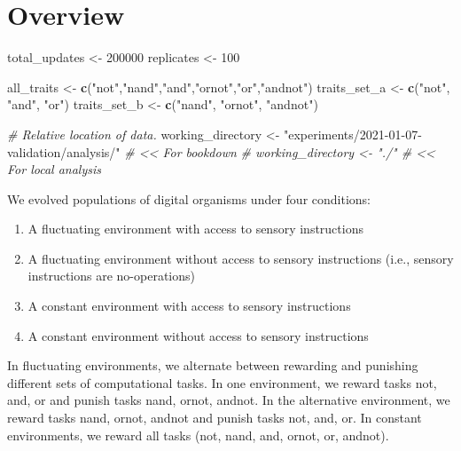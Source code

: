\documentclass[]{book}
\newenvironment{Shaded}{\begin{snugshade}}{\end{snugshade}}
\newcommand{\CommentTok}[1]{\textcolor[rgb]{0.56,0.35,0.01}{\textit{#1}}}
\newcommand{\DecValTok}[1]{\textcolor[rgb]{0.00,0.00,0.81}{#1}}
\newcommand{\KeywordTok}[1]{\textcolor[rgb]{0.13,0.29,0.53}{\textbf{#1}}}
\newcommand{\NormalTok}[1]{#1}
\newcommand{\StringTok}[1]{\textcolor[rgb]{0.31,0.60,0.02}{#1}}
\providecommand{\tightlist}{%
  \setlength{\itemsep}{0pt}\setlength{\parskip}{0pt}}
\begin{document}
\hypertarget{overview}{%
\section{Overview}\label{overview}}

\begin{Shaded}
\begin{Highlighting}[]
\NormalTok{total_updates <-}\StringTok{ }\DecValTok{200000}
\NormalTok{replicates <-}\StringTok{ }\DecValTok{100}

\NormalTok{all_traits <-}\StringTok{ }\KeywordTok{c}\NormalTok{(}\StringTok{"not"}\NormalTok{,}\StringTok{"nand"}\NormalTok{,}\StringTok{"and"}\NormalTok{,}\StringTok{"ornot"}\NormalTok{,}\StringTok{"or"}\NormalTok{,}\StringTok{"andnot"}\NormalTok{)}
\NormalTok{traits_set_a <-}\StringTok{ }\KeywordTok{c}\NormalTok{(}\StringTok{"not"}\NormalTok{, }\StringTok{"and"}\NormalTok{, }\StringTok{"or"}\NormalTok{)}
\NormalTok{traits_set_b <-}\StringTok{ }\KeywordTok{c}\NormalTok{(}\StringTok{"nand"}\NormalTok{, }\StringTok{"ornot"}\NormalTok{, }\StringTok{"andnot"}\NormalTok{)}

\CommentTok{# Relative location of data.}
\NormalTok{working_directory <-}\StringTok{ "experiments/2021-01-07-validation/analysis/"} \CommentTok{# << For bookdown}
\CommentTok{# working_directory <- "./"                                              # << For local analysis}
\end{Highlighting}
\end{Shaded}

We evolved populations of digital organisms under four conditions:

\begin{enumerate}
\def\labelenumi{\arabic{enumi}.}
\tightlist
\item
  A fluctuating environment with access to sensory instructions
\item
  A fluctuating environment without access to sensory instructions (i.e., sensory instructions are no-operations)
\item
  A constant environment with access to sensory instructions
\item
  A constant environment without access to sensory instructions
\end{enumerate}

In fluctuating environments, we alternate between rewarding and punishing different sets of computational tasks.
In one environment, we reward tasks not, and, or and punish tasks nand, ornot, andnot.
In the alternative environment, we reward tasks nand, ornot, andnot and punish tasks not, and, or.
In constant environments, we reward all tasks (not, nand, and, ornot, or, andnot).
\end{document}
